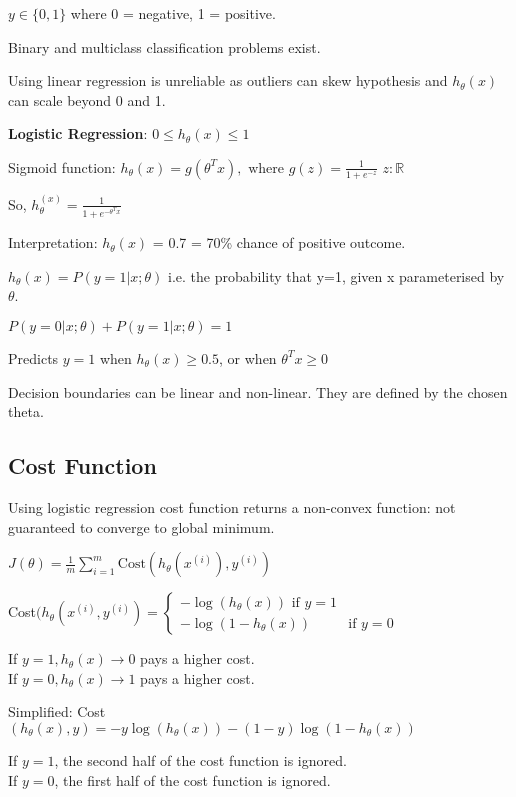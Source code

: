 \documentclass[12pt] {article}
\begin{document}
  $y \in\{0,1\}$ where 0 = negative, 1 = positive.

  Binary and multiclass classification problems exist. 

  Using linear regression is unreliable as outliers can skew hypothesis and
  $h_\theta(x)$ can scale beyond 0 and 1.

  \textbf{Logistic Regression}: $0 \leq h_\theta(x) \leq 1$

  Sigmoid function: $h_\theta(x) = g(\theta^Tx), \text{ where } 
  g(z) = \frac{1}{1+e^{-z}}$  $z: \mathbb{R}$

  So, $h_\theta^{(x)} = \frac{1}{1+e^{-\theta^Tx}}$

  Interpretation: $h_\theta(x)$ = 0.7 = 70\% chance of positive outcome.

  $h_\theta(x) = P(y=1|x;\theta)$ i.e. the probability that y=1, given x
  parameterised by $\theta$.

  $P(y=0|x;\theta) + P(y=1|x;\theta) = 1$

  Predicts $y=1$ when $h_\theta(x) \geq 0.5$, or when $\theta^Tx \geq 0$

  Decision boundaries can be linear and non-linear. They are defined
  by the chosen theta.

  \subsection{Cost Function}

  Using logistic regression cost function returns a non-convex function: not
  guaranteed to converge to global minimum.

  $J(\theta) = \frac{1}{m} \displaystyle\sum_{i=1}^{m} \text{Cost}
  (h_\theta(x^{(i)}),y^{(i)})$
  
  Cost$(h_\theta(x^{(i)}, y^{(i)}) = \begin{cases}
    -\log(h_\theta(x)) \text{ if } y=1\\
    -\log(1-h_\theta(x)) & \text{if } y=0 \end{cases}$

  If $y=1, h_\theta(x)\rightarrow0$ pays a higher cost.\\ 
  If $y=0, h_\theta(x)\rightarrow1$ pays a higher cost.

  Simplified: Cost$(h_\theta(x),y) = -y\log(h_\theta(x)) 
  - (1-y)\log(1-h_\theta(x))$

  If $y=1$, the second half of the cost function is ignored.\\
  If $y=0$, the first half of the cost function is ignored.
  
\end{document}
